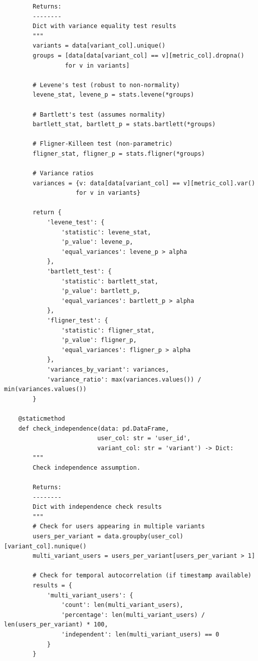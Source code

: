 \begin{lstlisting}
        Returns:
        --------
        Dict with variance equality test results
        """
        variants = data[variant_col].unique()
        groups = [data[data[variant_col] == v][metric_col].dropna()
                 for v in variants]

        # Levene's test (robust to non-normality)
        levene_stat, levene_p = stats.levene(*groups)

        # Bartlett's test (assumes normality)
        bartlett_stat, bartlett_p = stats.bartlett(*groups)

        # Fligner-Killeen test (non-parametric)
        fligner_stat, fligner_p = stats.fligner(*groups)

        # Variance ratios
        variances = {v: data[data[variant_col] == v][metric_col].var()
                    for v in variants}

        return {
            'levene_test': {
                'statistic': levene_stat,
                'p_value': levene_p,
                'equal_variances': levene_p > alpha
            },
            'bartlett_test': {
                'statistic': bartlett_stat,
                'p_value': bartlett_p,
                'equal_variances': bartlett_p > alpha
            },
            'fligner_test': {
                'statistic': fligner_stat,
                'p_value': fligner_p,
                'equal_variances': fligner_p > alpha
            },
            'variances_by_variant': variances,
            'variance_ratio': max(variances.values()) / min(variances.values())
        }

    @staticmethod
    def check_independence(data: pd.DataFrame,
                          user_col: str = 'user_id',
                          variant_col: str = 'variant') -> Dict:
        """
        Check independence assumption.

        Returns:
        --------
        Dict with independence check results
        """
        # Check for users appearing in multiple variants
        users_per_variant = data.groupby(user_col)[variant_col].nunique()
        multi_variant_users = users_per_variant[users_per_variant > 1]

        # Check for temporal autocorrelation (if timestamp available)
        results = {
            'multi_variant_users': {
                'count': len(multi_variant_users),
                'percentage': len(multi_variant_users) / len(users_per_variant) * 100,
                'independent': len(multi_variant_users) == 0
            }
        }


\end{lstlisting}

